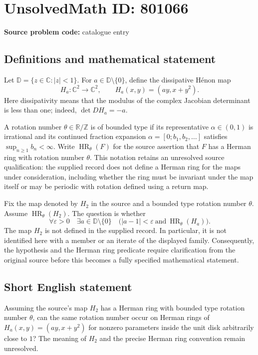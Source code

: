 \documentclass[11pt]{article}
\newcommand{\Z}{\mathbb{Z}}
\newcommand{\R}{\mathbb{R}}
\newcommand{\C}{\mathbb{C}}
\begin{document}
\section*{UnsolvedMath ID: 801066}
\textbf{Source problem code:} catalogue entry
\subsection{Definitions and mathematical statement}
Let \(\mathbb D=\{z\in\C:|z|<1\}\). For \(a\in\mathbb D\setminus\{0\}\), define the dissipative H\'enon map
\[
H_a:\C^2\longrightarrow\C^2,\qquad H_a(x,y)=(ay,x+y^2).
\]
Here dissipativity means that the modulus of the complex Jacobian determinant is less than one; indeed, \(\det DH_a=-a\).

A rotation number \(\theta\in\R/\Z\) is of bounded type if its representative \(\alpha\in(0,1)\) is irrational and its continued fraction expansion \(\alpha=[0;b_1,b_2,\ldots]\) satisfies \(\sup_{n\geq1}b_n<\infty\). Write \(\operatorname{HR}_{\theta}(F)\) for the source assertion that \(F\) has a Herman ring with rotation number \(\theta\). This notation retains an unresolved source qualification: the supplied record does not define a Herman ring for the maps under consideration, including whether the ring must be invariant under the map itself or may be periodic with rotation defined using a return map.

Fix the map denoted by \(H_2\) in the source and a bounded type rotation number \(\theta\). Assume \(\operatorname{HR}_{\theta}(H_2)\). The question is whether
\[
\forall\varepsilon>0\quad\exists a\in\mathbb D\setminus\{0\}\quad
\bigl(|a-1|<\varepsilon\ \text{and}\ \operatorname{HR}_{\theta}(H_a)\bigr).
\]
The map \(H_2\) is not defined in the supplied record. In particular, it is not identified here with a member or an iterate of the displayed family. Consequently, the hypothesis and the Herman ring predicate require clarification from the original source before this becomes a fully specified mathematical statement.
\subsection{Short English statement}
Assuming the source's map \(H_2\) has a Herman ring with bounded type rotation number \(\theta\), can the same rotation number occur on Herman rings of \(H_a(x,y)=(ay,x+y^2)\) for nonzero parameters inside the unit disk arbitrarily close to \(1\)? The meaning of \(H_2\) and the precise Herman ring convention remain unresolved.
\end{document}
